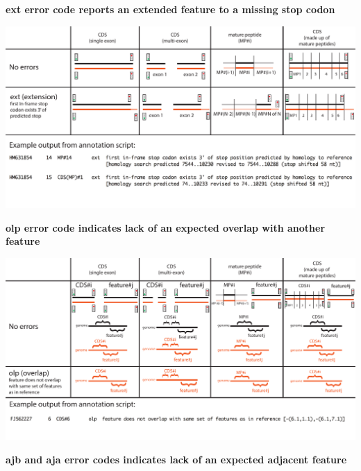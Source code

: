 \documentclass[landscape]{slides}
\begin{document}
\begin{slide}
\begin{center}
\textbf{ext error code reports an extended feature to a missing stop codon}
\vspace{0.5in}

\includegraphics[width=10in]{figs/errornew-2-ext}
\end{center}
\vfill
\end{slide}
\begin{slide}
\begin{center}
\textbf{olp error code indicates lack of an expected overlap with
  another feature}
\vspace{0.5in}

\includegraphics[width=10in]{figs/errornew-3-olp}
\end{center}
\vfill
\end{slide}
\begin{slide}
\begin{center}
\textbf{ajb and aja error codes indicates lack of an expected adjacent feature}
\vspace{0.5in}

\end{center}
\vfill
\end{slide}
\end{document}
